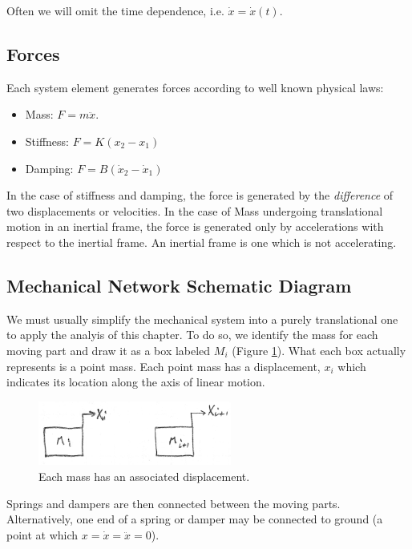 Often we will omit the time dependence, i.e. $\dot{x} = \dot{x}(t)$.



\subsection{Forces}

Each system element generates forces according to well known physical laws:

\begin{itemize}
  \item Mass:  $F=m\ddot{x}$.
  \item Stiffness:  $F= K(x_2-x_1)$
  \item Damping:    $F= B(\dot{x}_2- \dot{x}_1)$
\end{itemize}

In the case of stiffness and damping, the force is generated by the {\it difference} of two displacements or velocities.   In the case of Mass undergoing translational motion in an inertial frame, the force is generated only by accelerations with respect to the inertial frame.   An inertial frame is one which is not accelerating.


\subsection{Mechanical Network Schematic Diagram}

We must usually simplify the mechanical system into a purely translational one to apply the analyis of this chapter.   To do so, we identify the mass for each moving part and draw it as a box labeled $M_i$ (Figure \ref{masses}).   What each box actually represents is a point mass.  Each point mass has a displacement, $x_i$ which indicates its location along the axis of linear motion.



\begin{figure}\centering
\includegraphics[width=2.5in]{figs02/00720a.png}
\caption{Each mass has an associated displacement.}\label{masses}
\end{figure}


Springs and dampers are then connected between the moving parts.   Alternatively, one end of a spring or damper may be connected to ground (a point at which $x = \dot{x} = \ddot{x} = 0$).


